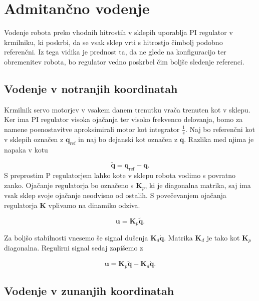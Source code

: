 \documentclass[a4paper]{article}
\begin{document}
\section{Admitančno vodenje}

Vodenje robota preko vhodnih hitrostih v sklepih uporablja PI regulator v krmilniku, ki poskrbi, da se vsak sklep vrti s hitrostjo čimbolj podobno referenčni. Iz tega vidika je prednost ta, da ne glede na konfiguracijo ter obremenitev robota, bo regulator vedno poskrbel čim boljše sledenje referenci. 


\subsection{Vodenje v notranjih koordinatah} \label{sec:admit_inner}

Krmilnik servo motorjev v vsakem danem trenutku vrača trenuten kot v sklepu. Ker ima PI regulator visoka ojačanja ter visoko frekvenco delovanja, bomo za namene poenostavitve aproksimirali motor kot integrator $\frac{1}{s}$. Naj bo referenčni kot v sklepih označen z $\textbf{q}_{\mathrm{ref}}$ in naj bo dejanski kot označen z $\textbf{q}$. Razlika med njima je napaka v kotu 

\begin{equation}
\tilde{\textbf{q}} = \textbf{q}_{\mathrm{ref}} - \textbf{q}.
\end{equation}
S preprostim P regulatorjem lahko kote v sklepu robota vodimo s povratno zanko. Ojačanje regulatorja bo označe\-no s $\textbf{K}_p$, ki je diagonalna matrika, saj ima vsak sklep svoje ojačanje neodvisno od ostalih. S povečevanjem ojačanja regulatorja \textbf{K} vplivamo na dinamiko odziva.

\begin{equation} \label{eq:p_reg_q}
\textbf{u} = \textbf{K}_p  \tilde{\textbf{q}}.
\end{equation}


Za boljšo stabilnosti vnesemo še signal dušenja $\textbf{K}_d \dot{\mathbf{q}}$. Matrika $\textbf{K}_d$ je tako kot $\textbf{K}_p$ diagonalna. Regulirni signal sedaj zapišemo z

\begin{equation} \label{eq:pd_reg_q}
\textbf{u} = \textbf{K}_p \tilde{\mathbf{q}} - \textbf{K}_d \dot{\mathbf{q}}.
\end{equation}

\subsection{Vodenje v zunanjih koordinatah} \label{sec:admit_out}
\end{document}
